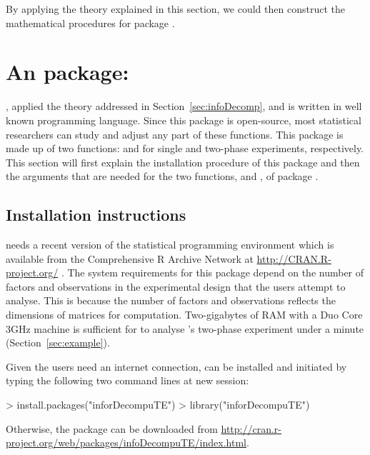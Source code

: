 \documentclass[article]{jss}
\begin{document}
By applying the theory explained in this section, we could then construct the mathematical procedures for  package .

\section[InfoDecompuTE]{An  package: } \label{sec:package}
, applied the theory addressed in Section~\ref{sec:infoDecomp}, and is written in well known  programming language. Since this package is open-source, most statistical researchers can study and adjust any part of these functions. This package is made up of two functions:  and  for single and two-phase experiments, respectively. This section will first explain the installation procedure of this package and then the arguments that are needed for the two functions,  and , of package .

\subsection{Installation instructions}
 needs a recent version of the  statistical programming environment which is available from the Comprehensive R Archive Network at \url{http://CRAN.R-project.org/} \citep{R2010}. The system requirements for this package depend on the number of factors and observations in the experimental design that the users attempt to analyse. This is because the number of factors and observations reflects the dimensions of matrices for computation. Two-gigabytes of RAM with a Duo Core 3GHz machine is sufficient for  to analyse \citeauthor{Brien1999}'s two-phase experiment under a minute (Section~\ref{sec:example}).

Given the users need an internet connection,  can be installed and initiated by typing the following two command lines at new  session: 
\begin{CodeChunk}
\begin{CodeInput}
> install.packages("inforDecompuTE")
> library("inforDecompuTE")
\end{CodeInput}
\end{CodeChunk}
Otherwise, the package can be downloaded from \url{http://cran.r-project.org/web/packages/infoDecompuTE/index.html}.
\end{document}
